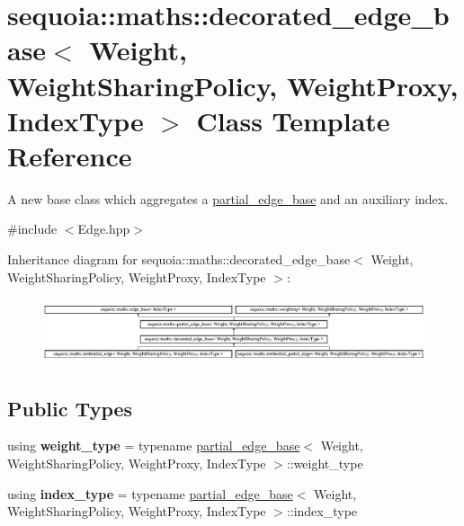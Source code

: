 \hypertarget{classsequoia_1_1maths_1_1decorated__edge__base}{}\section{sequoia\+::maths\+::decorated\+\_\+edge\+\_\+base$<$ Weight, Weight\+Sharing\+Policy, Weight\+Proxy, Index\+Type $>$ Class Template Reference}
\label{classsequoia_1_1maths_1_1decorated__edge__base}


A new base class which aggregates a \mbox{\hyperlink{classsequoia_1_1maths_1_1partial__edge__base}{partial\+\_\+edge\+\_\+base}} and an auxiliary index.  




{\ttfamily \#include $<$Edge.\+hpp$>$}

Inheritance diagram for sequoia\+::maths\+::decorated\+\_\+edge\+\_\+base$<$ Weight, Weight\+Sharing\+Policy, Weight\+Proxy, Index\+Type $>$\+:\begin{figure}[H]
\begin{center}
\leavevmode
\includegraphics[height=1.941074cm]{classsequoia_1_1maths_1_1decorated__edge__base}
\end{center}
\end{figure}
\subsection*{Public Types}
\begin{DoxyCompactItemize}
\item 
\mbox{\label{classsequoia_1_1maths_1_1decorated__edge__base_a0684597c8ea7233595168aaef8c1c615}} 
using {\bfseries weight\+\_\+type} = typename \mbox{\hyperlink{classsequoia_1_1maths_1_1partial__edge__base}{partial\+\_\+edge\+\_\+base}}$<$ Weight, Weight\+Sharing\+Policy, Weight\+Proxy, Index\+Type $>$\+::weight\+\_\+type
\item 
\mbox{\label{classsequoia_1_1maths_1_1decorated__edge__base_a914cb57e27f7392ccc0d3b9fa47826ff}} 
using {\bfseries index\+\_\+type} = typename \mbox{\hyperlink{classsequoia_1_1maths_1_1partial__edge__base}{partial\+\_\+edge\+\_\+base}}$<$ Weight, Weight\+Sharing\+Policy, Weight\+Proxy, Index\+Type $>$\+::index\+\_\+type
\end{DoxyCompactItemize}
